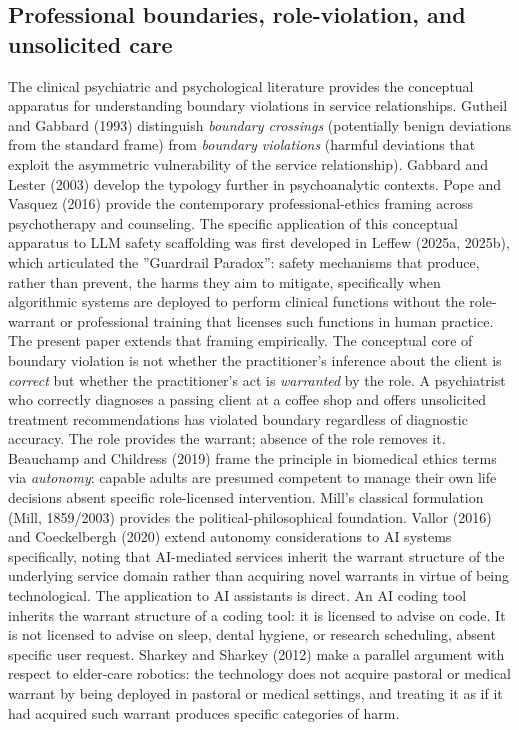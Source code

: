 \documentclass{obelus-preprint}
\begin{document}
\subsection{Professional boundaries, role-violation, and unsolicited care}
The clinical psychiatric and psychological literature provides the conceptual apparatus for understanding boundary violations in service relationships. Gutheil and Gabbard (1993) distinguish \emph{boundary crossings} (potentially benign deviations from the standard frame) from \emph{boundary violations} (harmful deviations that exploit the asymmetric vulnerability of the service relationship). Gabbard and Lester (2003) develop the typology further in psychoanalytic contexts. Pope and Vasquez (2016) provide the contemporary professional-ethics framing across psychotherapy and counseling. The specific application of this conceptual apparatus to LLM safety scaffolding was first developed in Leffew (2025a, 2025b), which articulated the ''Guardrail Paradox'': safety mechanisms that produce, rather than prevent, the harms they aim to mitigate, specifically when algorithmic systems are deployed to perform clinical functions without the role-warrant or professional training that licenses such functions in human practice. The present paper extends that framing empirically.
The conceptual core of boundary violation is not whether the practitioner's inference about the client is \emph{correct} but whether the practitioner's act is \emph{warranted} by the role. A psychiatrist who correctly diagnoses a passing client at a coffee shop and offers unsolicited treatment recommendations has violated boundary regardless of diagnostic accuracy. The role provides the warrant; absence of the role removes it.
Beauchamp and Childress (2019) frame the principle in biomedical ethics terms via \emph{autonomy}: capable adults are presumed competent to manage their own life decisions absent specific role-licensed intervention. Mill's classical formulation (Mill, 1859/2003) provides the political-philosophical foundation. Vallor (2016) and Coeckelbergh (2020) extend autonomy considerations to AI systems specifically, noting that AI-mediated services inherit the warrant structure of the underlying service domain rather than acquiring novel warrants in virtue of being technological.
The application to AI assistants is direct. An AI coding tool inherits the warrant structure of a coding tool: it is licensed to advise on code. It is not licensed to advise on sleep, dental hygiene, or research scheduling, absent specific user request. Sharkey and Sharkey (2012) make a parallel argument with respect to elder-care robotics: the technology does not acquire pastoral or medical warrant by being deployed in pastoral or medical settings, and treating it as if it had acquired such warrant produces specific categories of harm.
\end{document}
